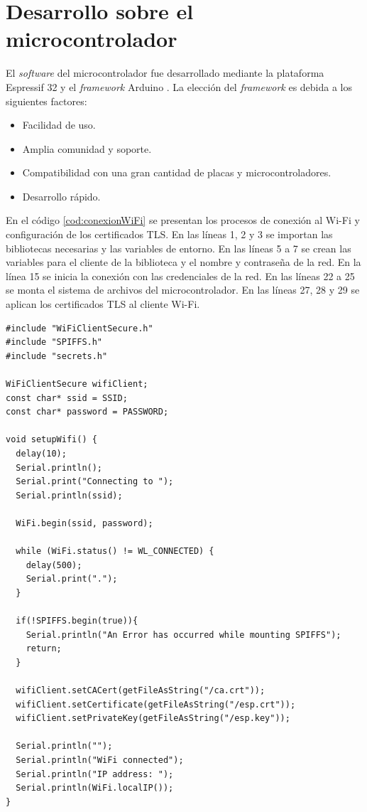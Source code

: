 \section{Desarrollo sobre el microcontrolador}

El \emph{software} del microcontrolador fue desarrollado mediante la plataforma Espressif 32 \citep{WEBSITE:ESPRESSIF32} y el \emph{framework} Arduino \citep{WEBSITE:ARDUINO}. La elección del \emph{framework} es debida a los siguientes factores: 

\begin{itemize}
	\item Facilidad de uso.
	\item Amplia comunidad y soporte.
	\item Compatibilidad con una gran cantidad de placas y microcontroladores.
	\item Desarrollo rápido.
\end{itemize}


En el código \ref{cod:conexionWiFi} se presentan los procesos de conexión al Wi-Fi y configuración de los certificados TLS. En las líneas 1, 2 y 3 se importan las bibliotecas necesarias y las variables de entorno. En las líneas 5 a 7 se crean las variables para el cliente de la biblioteca y el nombre y contraseña de la red. En la línea 15 se inicia la conexión con las credenciales de la red. En las líneas 22 a 25 se monta el sistema de archivos del microcontrolador. En las líneas 27, 28 y 29 se aplican los certificados TLS al cliente Wi-Fi.

\newpage
\begin{lstlisting}[label=cod:conexionWiFi,caption=Conexión Wi-Fi y configuración de los certificados TLS]
#include "WiFiClientSecure.h"
#include "SPIFFS.h"
#include "secrets.h"

WiFiClientSecure wifiClient;
const char* ssid = SSID;
const char* password = PASSWORD;

void setupWifi() {
  delay(10);
  Serial.println();
  Serial.print("Connecting to ");
  Serial.println(ssid);

  WiFi.begin(ssid, password);

  while (WiFi.status() != WL_CONNECTED) {
    delay(500);
    Serial.print(".");
  }

  if(!SPIFFS.begin(true)){
    Serial.println("An Error has occurred while mounting SPIFFS");
    return;
  }
  
  wifiClient.setCACert(getFileAsString("/ca.crt"));
  wifiClient.setCertificate(getFileAsString("/esp.crt"));
  wifiClient.setPrivateKey(getFileAsString("/esp.key"));
  
  Serial.println("");
  Serial.println("WiFi connected");
  Serial.println("IP address: ");
  Serial.println(WiFi.localIP());
}
\end{lstlisting}

